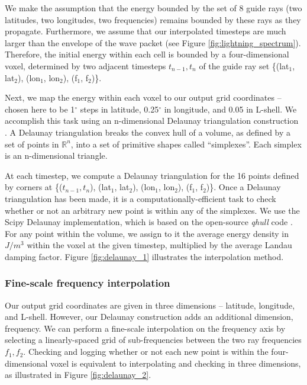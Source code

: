 We make the assumption that the energy bounded by the set of 8 guide rays (two latitudes, two longitudes, two frequencies) remains bounded by these rays as they propagate. Furthermore, we assume that our interpolated timesteps are much larger than the envelope of the wave packet (see Figure \ref{fig:lightning_spectrum}). Therefore, the initial energy within each cell is bounded by a four-dimensional voxel, determined by two adjacent timesteps $t_{n-1}, t_n$ of the guide ray set \{(lat$_1$, lat$_2$), (lon$_1$, lon$_2$), (f$_1$, f$_2$)\}.

Next, we map the energy within each voxel to our output grid coordinates -- chosen here to be 1$^\circ$ steps in latitude, 0.25$^\circ$ in longitude, and 0.05 in L-shell. We accomplish this task using an n-dimensional Delaunay triangulation construction \citep{Delaunay1934, Lee1980}. A Delaunay triangulation breaks the convex hull of a volume, as defined by a set of points in $\mathbb R^n$, into a set of primitive shapes called ``simplexes''. Each simplex is an n-dimensional triangle. 

At each timestep, we compute a Delaunay triangulation for the 16 points defined by corners at \{($t_{n-1}, t_n$), (lat$_1$, lat$_2$), (lon$_1$, lon$_2$), (f$_1$, f$_2$)\}. Once a Delaunay triangulation has been made, it is a computationally-efficient task to check whether or not an arbitrary new point is within any of the simplexes. We use the Scipy Delaunay implementation, which is based on the open-source \emph{qhull} code \citep{Barber1996}. For any point within the volume, we assign to it the average energy density in $J/m^3$ within the voxel at the given timestep, multiplied by the average Landau damping factor. Figure \ref{fig:delaunay_1} illustrates the interpolation method.

\subsubsection{Fine-scale frequency interpolation}
Our output grid coordinates are given in three dimensions -- latitude, longitude, and L-shell. However, our Delaunay construction adds an additional dimension, frequency. We can perform a fine-scale interpolation on the frequency axis by selecting a linearly-spaced grid of sub-frequencies between the two ray frequencies $f_1, f_2$. Checking and logging whether or not each new point is within the four-dimensional voxel is equivalent to interpolating and checking in three dimensions, as illustrated in Figure \ref{fig:delaunay_2}.

